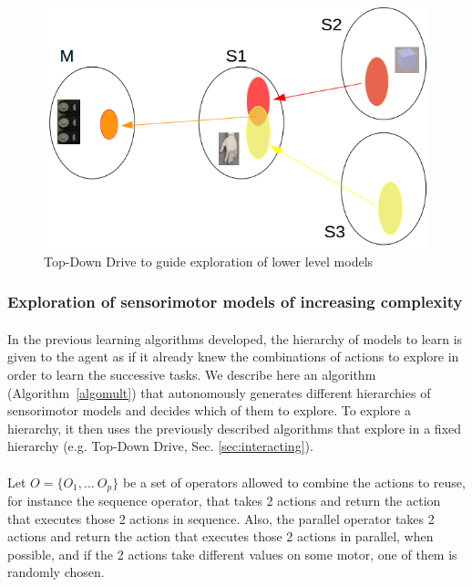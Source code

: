 \documentclass[12pt]{article}
\begin{document}
			
			\begin{figure}[H] 
				\centering 
				\includegraphics[width=12cm]{./include/tddriveext.png}
				\caption{Top-Down Drive to guide exploration of lower level models}
				\label{tddrive}
			\end{figure}



			
		\subsubsection{Exploration of sensorimotor models of increasing complexity}
		\label{sec:increasing}
		
			\paragraph{}
			In the previous learning algorithms developed, 
			the hierarchy of models to learn is given to the agent as if it already knew the combinations of actions
			to explore in order to learn the successive tasks.
			We describe here an algorithm (Algorithm~\ref{algomult}) that autonomously generates different hierarchies of sensorimotor models and decides which of them to explore.
			To explore a hierarchy, it then uses the previously described algorithms that explore in a fixed hierarchy (e.g. Top-Down Drive, Sec. \ref{sec:interacting}).
			
			\paragraph{}
			Let $O = \{O_1, ...~ O_p\}$ be a set of operators allowed to combine the actions to reuse, for instance the sequence operator, that
			takes 2 actions and return the action that executes those 2 actions in sequence.
			Also, the parallel operator
			takes 2 actions and return the action that executes those 2 actions in parallel, when possible, and if the 2 actions take different values on 
			some motor, one of them is randomly chosen.
			
\end{document}
